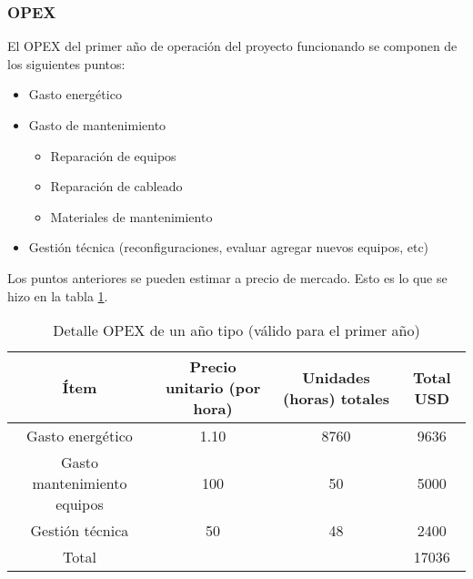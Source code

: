 \subsubsection{OPEX}
\label{sec:opex}

El OPEX del primer año de operación del proyecto funcionando se
componen de los siguientes puntos:
\begin{itemize}
\item Gasto energético
\item Gasto de mantenimiento
  \begin{itemize}
  \item Reparación de equipos
  \item Reparación de cableado
  \item Materiales de mantenimiento
  \end{itemize}
\item Gestión técnica (reconfiguraciones, evaluar agregar nuevos
  equipos, etc)
\end{itemize}

Los puntos anteriores se pueden estimar a precio de mercado. Esto es
lo que se hizo en la tabla \ref{tab:opex}.

\begin{table}[H]
  \centering
  \begin{tabular}{| c | c | c | c |}
    \hline{}
    Ítem & Precio unitario (por hora) & Unidades (horas) totales & Total USD \\
    \hline{}
    Gasto energético & 1.10 & 8760 & 9636 \\
    \hline{}
    Gasto mantenimiento equipos & 100 & 50 & 5000 \\
    \hline{}
    Gestión técnica & 50 & 48 & 2400 \\
    \hline{}
    Total & & & 17036 \\
    \hline
  \end{tabular}
  \caption{Detalle OPEX de un año tipo (válido para el primer año)}
  \label{tab:opex}
\end{table}